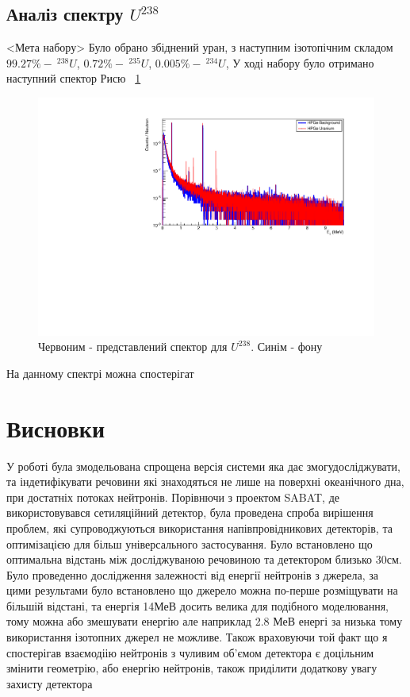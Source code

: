 \documentclass[a4paper, 14pt]{article}
\numberwithin{equation}{section}
\numberwithin{table}{section}
\begin{document}
\subsection{Аналіз спектру $U^{238}$}
	<Мета набору> Було обрано збіднений уран, з наступним ізотопічним складом $99.27\% -\  ^{238}U$, $ 0.72\% - \  ^{235}U$, $ 0.005\% - \ ^{234}U$, У ході набору було отримано наступний спектор Рисю ~\ref{ris:poorU}
	\begin{figure}[hbt!]
		\centering \includegraphics[width=1\textwidth]{res/poorUranium.pdf}
		\caption{Червоним - представлений спектор для $U^{238}$. Синім - фону} 
		\label{ris:poorU}	
	\end{figure} 	 
	На данному спектрі можна спостерігат
	
\newpage 
\section{Висновки}
\setcounter{figure}{0}
У роботі була змодельована спрощена версія системи яка дає змогудосліджувати, та індетифікувати речовини які знаходяться не лише на поверхні океанічного дна, при достатніх потоках нейтронів. Порівнючи з проектом SABAT, де використовувався сетиляційний детектор, була проведена спроба вирішення проблем, які супроводжуються використання напівпровідникових детекторів, та оптимізацією для більш універсального застосування. 
Було встановлено що оптимальна відстань між досліджуваною речовиною та детектором близько 30см. Було проведенно дослідження залежності від енергії нейтронів з джерела, за цими результами було встановлено що джерело можна по-перше розміщувати на більшій відстані, та енергія 14МеВ досить велика для подібного моделювання, тому можна або змешувати енергію але наприклад 2.8 МеВ енергі за низька тому використання ізотопних джерел не можливе. Також враховуючи той факт що я спостерігав взаємодіію нейтронів з чуливим об'ємом детектора є доцільним змінити геометрію, або енергію нейтронів, також приділити додаткову увагу захисту детектора 
\end{document}
